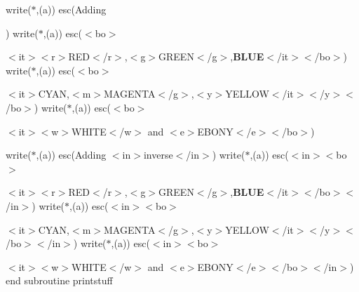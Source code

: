 write($\ast$,\textquotesingle{}(a)\textquotesingle{}) esc(\textquotesingle{}Adding 
\begin{DoxyItemize}
\item 
\end{DoxyItemize}\textquotesingle{}) write($\ast$,\textquotesingle{}(a)\textquotesingle{}) esc(\textquotesingle{}$<$bo$>$
\begin{DoxyItemize}
\item 
\end{DoxyItemize}$<$it$>$$<$r$>$R\+ED$<$/r$>$,$<$g$>$G\+R\+E\+EN$<$/g$>$,{\bfseries B\+L\+UE}$<$/it$>$$<$/bo$>$\textquotesingle{}) write($\ast$,\textquotesingle{}(a)\textquotesingle{}) esc(\textquotesingle{}$<$bo$>$
\begin{DoxyItemize}
\item 
\end{DoxyItemize}$<$it$>${\ttfamily C\+Y\+AN},$<$m$>$M\+A\+G\+E\+N\+TA$<$/g$>$,$<$y$>$Y\+E\+L\+L\+OW$<$/it$>$$<$/y$>$$<$/bo$>$\textquotesingle{}) write($\ast$,\textquotesingle{}(a)\textquotesingle{}) esc(\textquotesingle{}$<$bo$>$
\begin{DoxyItemize}
\item 
\end{DoxyItemize}$<$it$>$$<$w$>$W\+H\+I\+TE$<$/w$>$ and $<$e$>$E\+B\+O\+NY$<$/e$>$$<$/bo$>$\textquotesingle{})

write($\ast$,\textquotesingle{}(a)\textquotesingle{}) esc(\textquotesingle{}Adding $<$in$>$inverse$<$/in$>$\textquotesingle{}) write($\ast$,\textquotesingle{}(a)\textquotesingle{}) esc(\textquotesingle{}$<$in$>$$<$bo$>$
\begin{DoxyItemize}
\item 
\end{DoxyItemize}$<$it$>$$<$r$>$R\+ED$<$/r$>$,$<$g$>$G\+R\+E\+EN$<$/g$>$,{\bfseries B\+L\+UE}$<$/it$>$$<$/bo$>$$<$/in$>$\textquotesingle{}) write($\ast$,\textquotesingle{}(a)\textquotesingle{}) esc(\textquotesingle{}$<$in$>$$<$bo$>$
\begin{DoxyItemize}
\item 
\end{DoxyItemize}$<$it$>${\ttfamily C\+Y\+AN},$<$m$>$M\+A\+G\+E\+N\+TA$<$/g$>$,$<$y$>$Y\+E\+L\+L\+OW$<$/it$>$$<$/y$>$$<$/bo$>$$<$/in$>$\textquotesingle{}) write($\ast$,\textquotesingle{}(a)\textquotesingle{}) esc(\textquotesingle{}$<$in$>$$<$bo$>$
\begin{DoxyItemize}
\item 
\end{DoxyItemize}$<$it$>$$<$w$>$W\+H\+I\+TE$<$/w$>$ and $<$e$>$E\+B\+O\+NY$<$/e$>$$<$/bo$>$$<$/in$>$\textquotesingle{}) end subroutine printstuff

